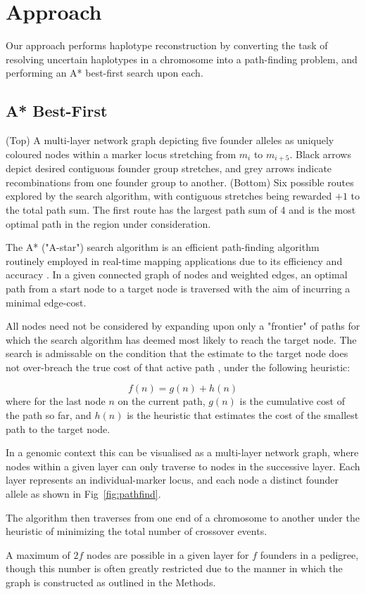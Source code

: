 
\section{Approach}

Our approach performs haplotype reconstruction by converting the task of resolving uncertain haplotypes in a chromosome into a path-finding problem, and performing an A* best-first search upon each.

\subsection{A* Best-First}

	{(Top) A multi-layer network graph depicting five founder alleles as uniquely coloured nodes within a marker locus stretching from $m_i$ to $m_{i+5}$. Black arrows depict desired contiguous founder group stretches, and grey arrows indicate recombinations from one founder group to another. (Bottom) Six possible routes explored by the search algorithm, with contiguous stretches being rewarded $+1$ to the total path sum. The first route has the largest path sum of 4 and is the most optimal path in the region under consideration.}

The A* ("A-star") search algorithm is an efficient path-finding algorithm routinely employed in real-time mapping applications due to its efficiency and accuracy \citep{stout1996smart,seet2004star}. In a given connected graph of nodes and weighted edges, an optimal path from a start node to a target node is traversed with the aim of incurring a minimal edge-cost. 

All nodes need not be considered by expanding upon only a "frontier" of paths for which the search algorithm has deemed most likely to reach the target node. The search is admissable on the condition that the estimate to the target node does not over-breach the true cost of that active path \citep{astar}, under the following heuristic:

\begin{equation}
f(n) = g(n) + h(n)
\end{equation}
where for the last node $n$ on the current path, $g(n)$ is the cumulative cost of the path so far, and $h(n)$ is the heuristic that estimates the cost of the smallest path to the target node.

In a genomic context this can be visualised as a multi-layer network graph, where nodes within a given layer can only traverse to nodes in the successive layer. Each layer represents an individual-marker locus, and each node a distinct founder allele as shown in Fig~\ref{fig:pathfind}.

The algorithm then traverses from one end of a chromosome to another under the heuristic of minimizing the total number of crossover events.

A maximum of $2f$ nodes are possible in a given layer for $f$ founders in a pedigree, though this number is often greatly restricted due to the manner in which the graph is constructed as outlined in the Methods.